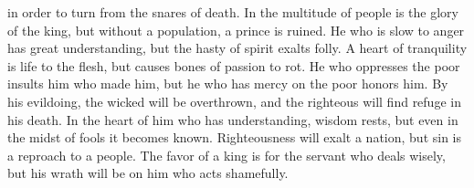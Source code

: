 \begin{biblechapter}
in order to turn from the snares of death.
\verse In the multitude of people is the glory of the king, 
but without a population, a prince is ruined.
\verse He who is slow to anger has great understanding, 
but the hasty of spirit exalts folly.
\verse A heart of tranquility is life to the flesh, 
but causes bones of passion to rot.
\verse He who oppresses the poor insults him who made him, 
but he who has mercy on the poor honors him.
\verse By his evildoing, the wicked will be overthrown, 
and the righteous will find refuge in his death.
\verse In the heart of him who has understanding, wisdom rests, 
but even in the midst of fools it becomes known.
\verse Righteousness will exalt a nation, 
but sin is a reproach to a people.
\verse The favor of a king is for the servant who deals wisely, 
but his wrath will be on him who acts shamefully.
\end{biblechapter}


